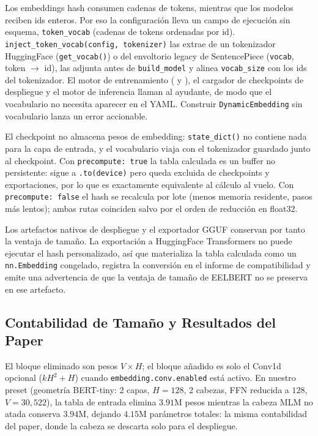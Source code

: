 Los embeddings hash consumen cadenas de tokens, mientras que los modelos reciben ids enteros. Por eso la configuración lleva un campo de ejecución sin esquema, \texttt{token\_vocab} (cadenas de tokens ordenadas por id). \texttt{inject\_token\_vocab(config, tokenizer)} las extrae de un tokenizador HuggingFace (\texttt{get\_vocab()}) o del envoltorio legacy de SentencePiece (\texttt{vocab}, token $\to$ id), las adjunta antes de \texttt{build\_model} y alinea \texttt{vocab\_size} con los ids del tokenizador. El motor de entrenamiento ( y ), el cargador de checkpoints de despliegue y el motor de inferencia llaman al ayudante, de modo que el vocabulario no necesita aparecer en el YAML. Construir \texttt{DynamicEmbedding} sin vocabulario lanza un error accionable.

El checkpoint no almacena pesos de embedding: \texttt{state\_dict()} no contiene nada para la capa de entrada, y el vocabulario viaja con el tokenizador guardado junto al checkpoint. Con \texttt{precompute: true} la tabla calculada es un buffer no persistente: sigue a \texttt{.to(device)} pero queda excluida de checkpoints y exportaciones, por lo que es exactamente equivalente al cálculo al vuelo. Con \texttt{precompute: false} el hash se recalcula por lote (menos memoria residente, pasos más lentos); ambas rutas coinciden salvo por el orden de reducción en float32.

Los artefactos nativos de despliegue y el exportador GGUF conservan por tanto la ventaja de tamaño. La exportación a HuggingFace Transformers no puede ejecutar el hash personalizado, así que materializa la tabla calculada como un \texttt{nn.Embedding} congelado, registra la conversión en el informe de compatibilidad y emite una advertencia de que la ventaja de tamaño de EELBERT no se preserva en ese artefacto.

\subsection{Contabilidad de Tamaño y Resultados del Paper}

El bloque eliminado son pesos $V\times H$; el bloque añadido es solo el Conv1d opcional ($k H^2 + H$) cuando \texttt{embedding.conv.enabled} está activo. En nuestro preset  (geometría BERT-tiny: 2 capas, $H=128$, 2 cabezas, FFN reducida a $128$, $V=30{,}522$), la tabla de entrada elimina $3.91$M pesos mientras la cabeza MLM no atada conserva $3.94$M, dejando $4.15$M parámetros totales: la misma contabilidad del paper, donde la cabeza se descarta solo para el despliegue.

